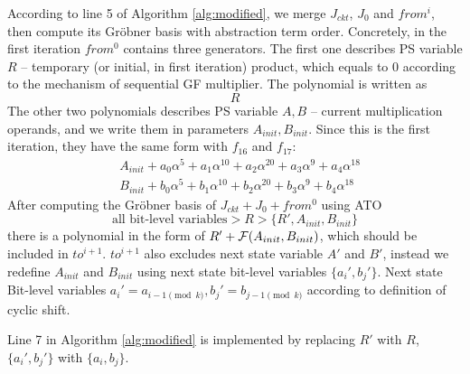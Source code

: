 \begin{Example}
According to line 5 of Algorithm \ref{alg:modified}, we merge $J_{ckt}$, $J_0$ and $from^i$, then compute its
Gr\"obner basis with abstraction term order. 
Concretely, in the first iteration $from^0$ contains three generators. The first one describes PS variable $R$ --
temporary (or initial, in first iteration) product, which equals to 0 according to the mechanism of sequential 
GF multiplier. The polynomial is written as 
$$R$$
The other two polynomials describes PS variable $A,B$ -- current multiplication operands, and we write them 
in parameters $A_{init}, B_{init}$. Since this is the first iteration, they have the same form with $f_{16}$ and $f_{17}$:
\begin{align*}
& A_{init}+a_0\alpha^5+a_1\alpha^{10}+a_2\alpha^{20}+a_3\alpha^9+a_4\alpha^{18} \\
& B_{init}+b_0\alpha^5+b_1\alpha^{10}+b_2\alpha^{20}+b_3\alpha^9+b_4\alpha^{18}
\end{align*}
After computing the Gr\"obner basis of $J_{ckt}+J_0+from^0$ using ATO 
$$\text{all bit-level variables} > R > \{R',A_{init},B_{init}\}$$
there is a polynomial in the form of $R'+{\mathcal{F}}(A_{init},B_{init})$,
which should be included in $to^{i+1}$. $to^{i+1}$ also excludes next state variable $A'$ and $B'$, instead we 
redefine $A_{init}$ and $B_{init}$ using next state bit-level variables $\{a_i', b_j'\}$. Next state Bit-level variables
$a_i' = a_{i-1\pmod k}, b_j' = b_{j-1\pmod k}$ according to definition of cyclic shift.

Line 7 in Algorithm \ref{alg:modified} is implemented by replacing $R'$ with $R$, $\{a_i', b_j'\}$ with $\{a_i,b_j\}$.


\end{Example}
